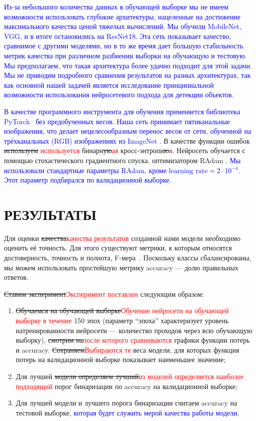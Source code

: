 \documentclass[
aps,%
12pt,%
final,%
notitlepage,%
oneside,%
onecolumn,%
nobibnotes,%
nofootinbib,%
superscriptaddress,%
noshowpacs,%
centertags]%
{revtex4}
\begin{document}
\textcolor{blue}{Из-за небольшого количества данных в обучающей выборке мы не имеем возможности использовать глубокие архитектуры, нацеленные на достижение максимального качества ценой тяжелых вычислений. Мы обучили MobileNet, VGG, и в итоге остановились на ResNet18. Эта сеть показывает качество, сравнимое с другими моделями, но в то же время дает большую стабильность метрик качества при различном разбиении выборки на обучающую и тестовую. Мы предполагаем, что такая архитектура более удачно подходит для этой задачи. Мы не приводим подробного сравнения результатов на разных архитектурах, так как основной нашей задачей является исследование принципиальной возможности использования нейросетевого подхода для детекции объектов.}

\textcolor{blue}{В качестве программного инструмента для обучения применяется библиотека PyTorch~\cite{NEURIPS2019_9015} без предобученных весов. Наша сеть принимает пятиканальные изображения, что делает нецелесообразным перенос весов от сети, обученной на трёхканальных (RGB) изображениях из ImageNet \cite{Russakovsky}.}
В качестве функции ошибок \sout{используем }\textcolor{red}{используется} бинарн\sout{ую}\textcolor{red}{ая} кросс-энтропи\sout{ю}\textcolor{red}{я}. Нейросеть обучается с помощью стохастического градиентного спуска, оптимизатором RAdam \cite{liu2019radam}. \textcolor{blue} {Мы использовали стандартные параметры RAdam, кроме $\text{learning rate} = 2\cdot10^{-4}$. Этот параметр подбирался по валидационной выборке.}


\section{РЕЗУЛЬТАТЫ}
\label{sec:results}

Для оценки \sout{качества}\textcolor{red}{качества результатов} созданной нами модели необходимо оценить её точность. Для этого существуют метрики, к которым относятся достоверность, точность и полнота, F-мера~\cite{Hossin2015}. Поскольку классы сбалансированы, мы можем использовать простейшую метрику accuracy --- долю правильных ответов.

\sout{Ставим эксперимент}\textcolor{red}{Эксперимент поставлен} следующим образом:
\begin{enumerate}
    \item \sout{Обучаемся на обучающей выборке}\textcolor{red}{Обучение нейросети на обучающей выборке в течение} 150 эпох (параметр ``эпоха'' характеризует уровень натренированности нейросети --- количество проходов через всю обучающую выборку), \sout{смотрим на}\textcolor{red}{после которого сравниваются} графики функции потерь и accuracy. \sout{Сохраняем}\textcolor{red}{Выбираются те} веса модели, для которых функция потерь на валидационной выборке показывает наименьшее значение;
    \item Для лучшей \sout{модели определяем лучший}\textcolor{red}{из моделей определяется наиболее подходящий} порог бинаризации по accuracy на валидационной выборке;
    \item Для лучшей модели и лучшего порога бинаризации считаем accuracy на тестовой выборке\textcolor{blue}{, которая будет служить мерой качества работы модели.}
\end{enumerate}
\end{document}
